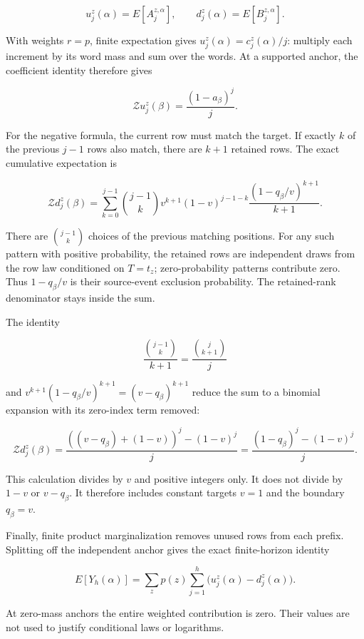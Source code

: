 \[
u_j^z(\alpha)=E[A_j^{z,\alpha}],\qquad
d_j^z(\alpha)=E[B_j^{z,\alpha}].
\]

With weights \(r=p\), finite expectation gives \(u_j^z(\alpha)=c_j^z(\alpha)/j\): multiply each increment by its word mass and sum over the words. At a supported anchor, the coefficient identity therefore gives

\[
\mathcal Zu_j^z(\beta)=\frac{(1-a_\beta)^j}{j}.
\]

For the negative formula, the current row must match the target. If exactly \(k\) of the previous \(j-1\) rows also match, there are \(k+1\) retained rows. The exact cumulative expectation is

\[
\mathcal Zd_j^z(\beta)=
\sum_{k=0}^{j-1}\binom{j-1}{k}
v^{k+1}(1-v)^{j-1-k}
\frac{(1-q_\beta/v)^{k+1}}{k+1}.
\]

There are \(\binom{j-1}{k}\) choices of the previous matching positions. For any such pattern with positive probability, the retained rows are independent draws from the row law conditioned on \(T=t_z\); zero-probability patterns contribute zero. Thus \(1-q_\beta/v\) is their source-event exclusion probability. The retained-rank denominator stays inside the sum.

The identity

\[
\frac{\binom{j-1}{k}}{k+1}=\frac{\binom{j}{k+1}}{j}
\]

and \(v^{k+1}(1-q_\beta/v)^{k+1}=(v-q_\beta)^{k+1}\) reduce the sum to a binomial expansion with its zero-index term removed:

\[
\mathcal Zd_j^z(\beta)
=\frac{((v-q_\beta)+(1-v))^j-(1-v)^j}{j}
=\frac{(1-q_\beta)^j-(1-v)^j}{j}.
\]

This calculation divides by \(v\) and positive integers only. It does not divide by \(1-v\) or \(v-q_\beta\). It therefore includes constant targets \(v=1\) and the boundary \(q_\beta=v\).

Finally, finite product marginalization removes unused rows from each prefix. Splitting off the independent anchor gives the exact finite-horizon identity

\[
E[Y_h(\alpha)]
=\sum_zp(z)\sum_{j=1}^h\bigl(u_j^z(\alpha)-d_j^z(\alpha)\bigr).
\]

At zero-mass anchors the entire weighted contribution is zero. Their values are not used to justify conditional laws or logarithms.

\label{why-the-mean-converges-to-the-named-atom}

